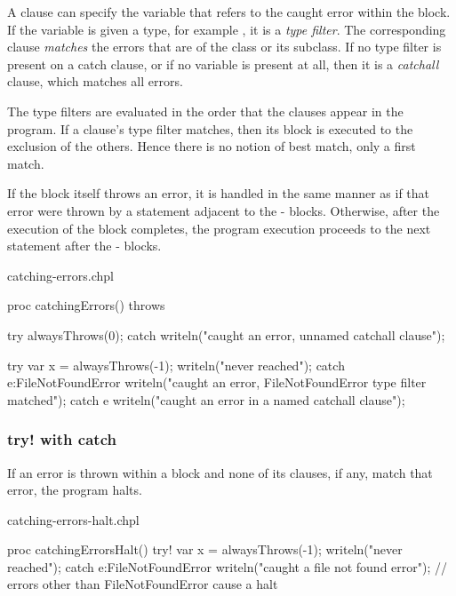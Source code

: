 A  clause can specify the variable that refers to the caught
error within the  block. If the variable is given a type,
for example , it is a \emph{type filter}.
The corresponding  clause \emph{matches} the errors
that are of the class  or its subclass. If no type
filter is present on a catch clause, or if no variable is present at
all, then it is a \emph{catchall} clause, which matches all errors.

The type filters are evaluated in the order that the  clauses
appear in the program. If a  clause's type filter matches,
then its block is executed to the exclusion of the others. Hence there
is no notion of best match, only a first match.

If the  block itself throws an error, it is handled in the
same manner as if that error were thrown by a statement adjacent to the
- blocks. Otherwise, after the execution of the
 block completes, the program execution proceeds to the
next statement after the - blocks.

\begin{chapelexample}{catching-errors.chpl}
\begin{chapel}
proc catchingErrors() throws {
  try {
    alwaysThrows(0);
  } catch {
    writeln("caught an error, unnamed catchall clause");
  }

  try {
    var x = alwaysThrows(-1);
    writeln("never reached");
  } catch e:FileNotFoundError {
    writeln("caught an error, FileNotFoundError type filter matched");
  } catch e {
    writeln("caught an error in a named catchall clause");
  }
}
\end{chapel}
\begin{chapelpost}
\end{chapelpost}
\begin{chapeloutput}
\end{chapeloutput}
\end{chapelexample}

\subsubsection{try! with catch}
\label{try_bang_with_catch}

If an error is thrown within a  block and none of its
 clauses, if any, match that error, the program halts.

\begin{chapelexample}{catching-errors-halt.chpl}
\begin{chapel}
proc catchingErrorsHalt() {
  try! {
    var x = alwaysThrows(-1);
    writeln("never reached");
  } catch e:FileNotFoundError {
    writeln("caught a file not found error");
  }
  // errors other than FileNotFoundError cause a halt
}
\end{chapel}
\begin{chapelpost}
\end{chapelpost}
\begin{chapeloutput}
\end{chapeloutput}
\end{chapelexample}

